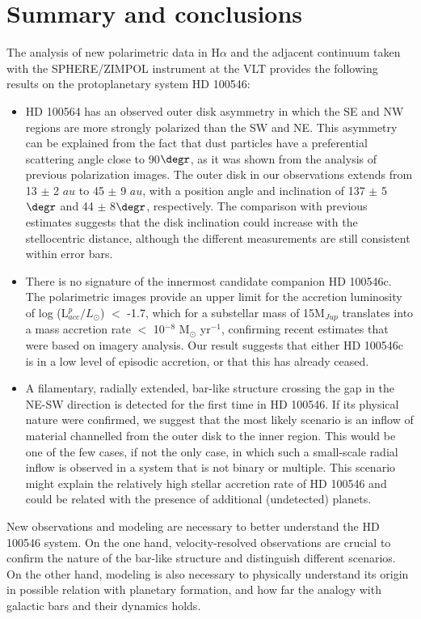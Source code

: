 \documentclass{aa}
\begin{document}
\section{Summary and conclusions}
\label{Sect:Conclusions}
The analysis of new polarimetric data in H$\alpha$ and the adjacent continuum taken with the SPHERE/ZIMPOL instrument at the VLT provides the following results on the protoplanetary system HD 100546:
\begin{itemize}
 \item HD 100564 has an observed outer disk asymmetry in which the SE and NW regions are more strongly polarized than the SW and NE. This asymmetry can be explained from the fact that dust particles have a preferential scattering angle close to 90$\degr$, as it was shown from the analysis of previous polarization images. The outer disk in our observations extends from 13 $\pm$ 2 $au$ to 45 $\pm$ 9 $au$, with a position angle and inclination of 137 $\pm$ 5$\degr$ and 44 $\pm$ 8$\degr$, respectively. The comparison with previous estimates suggests that the disk inclination could increase with the stellocentric distance, although the different measurements are still consistent within error bars.      
 \item There is no signature of the innermost candidate companion HD 100546c. The polarimetric images provide an upper limit for the accretion luminosity of log (L$_{acc}^p/L_{\odot}$) $<$ -1.7, which for a substellar mass of 15M$_{Jup}$ translates into a mass accretion rate $<$ 10$^{-8}$ M$_{\odot}$ yr$^{-1}$, confirming recent estimates that were based on imagery analysis. Our result suggests that either HD 100546c is in a low level of episodic accretion, or that this has already ceased.
 \item A filamentary, radially extended, bar-like structure crossing the gap in the NE-SW direction is detected for the first time in HD 100546. If its physical nature were confirmed, we suggest that the most likely scenario is an inflow of material channelled from the outer disk to the inner region. This would be one of the few cases, if not the only case, in which such a small-scale radial inflow is observed in a system that is not binary or multiple. This scenario might explain the relatively high stellar accretion rate of HD 100546 and could be related with the presence of additional (undetected) planets. 
\end{itemize}
New observations and modeling are necessary to better understand the HD 100546 system. On the one hand, velocity-resolved observations are crucial to confirm the nature of the bar-like structure and distinguish different scenarios. On the other hand, modeling is also necessary to physically understand its origin in possible relation with planetary formation, and how far the analogy with galactic bars and their dynamics holds. 
\end{document}
